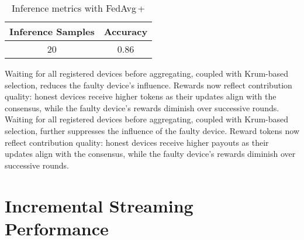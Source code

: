 \begin{table}[h!]
    \centering
    \caption{Inference metrics with FedAvg\,+}
    \label{tab:fedavg_plus_inference}
    \begin{tabular}{c c}
        \toprule
        \textbf{Inference Samples} & \textbf{Accuracy} \\
        \midrule
        20 & 0.86 \\
        \bottomrule
    \end{tabular}
\end{table}

Waiting for all registered devices before aggregating, coupled with Krum-based selection, reduces the faulty device’s influence. Rewards now reflect contribution quality: honest devices receive higher tokens as their updates align with the consensus, while the faulty device’s rewards diminish over successive rounds.
Waiting for all registered devices before aggregating, coupled with Krum-based selection, further suppresses the influence of the faulty device. Reward tokens now reflect contribution quality: honest devices receive higher payouts as their updates align with the consensus, while the faulty device’s rewards diminish over successive rounds.

\section{Incremental Streaming Performance}

